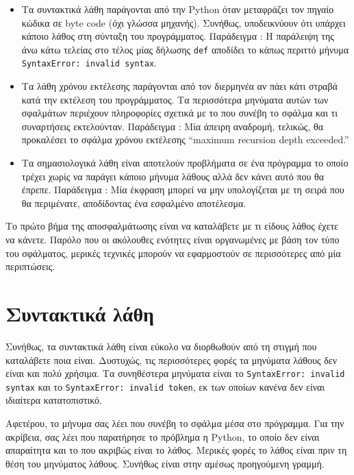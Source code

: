 \documentclass[10pt]{book}
\begin{document}
\begin{itemize}

\item  Τα συντακτικά λάθη παράγονται από την  Python  όταν μεταφράζει τον πηγαίο 
  κώδικα σε  byte code  (όχι γλώσσα μηχανής).  Συνήθως, υποδεικνύουν ότι υπάρχει κάποιο 
  λάθος στη σύνταξη του προγράμματος.  Παράδειγμα :   Η παράλειψη της άνω κάτω τελείας 
  στο τέλος μίας δήλωσης  {\tt def}  αποδίδει το κάπως περιττό μήνυμα  
  {\tt SyntaxError: invalid syntax}.

\item  Τα λάθη χρόνου εκτέλεσης παράγονται από τον διερμηνέα αν πάει κάτι στραβά κατά την 
  εκτέλεση του προγράμματος.  Τα περισσότερα μηνύματα αυτών των σφαλμάτων περιέχουν 
  πληροφορίες σχετικά με το που συνέβη το σφάλμα και τι συναρτήσεις εκτελούνταν. 
  Παράδειγμα :  Μία άπειρη αναδρομή, τελικώς, θα προκαλέσει το σφάλμα χρόνου εκτέλεσης 
   ``maximum recursion depth exceeded.''

\item  Τα σημασιολογικά λάθη είναι αποτελούν προβλήματα σε ένα πρόγραμμα το οποίο τρέχει 
  χωρίς να παράγει κάποιο μήνυμα λάθους αλλά δεν κάνει αυτό που θα έπρεπε.  Παράδειγμα : 
   Μία έκφραση μπορεί να μην υπολογίζεται με τη σειρά που θα περιμένατε, αποδίδοντας 
  ένα εσφαλμένο αποτέλεσμα. 

\end{itemize}

 Το πρώτο βήμα της αποσφαλμάτωσης είναι να καταλάβετε με τι είδους λάθος έχετε να κάνετε.  
Παρόλο που οι ακόλουθες ενότητες είναι οργανωμένες με βάση τον τύπο του σφάλματος, μερικές τεχνικές μπορούν να εφαρμοστούν σε περισσότερες από μία περιπτώσεις.


\section{Συντακτικά λάθη}

Συνήθως, τα συντακτικά λάθη είναι εύκολο να διορθωθούν από τη στιγμή που καταλάβετε ποια 
είναι.  Δυστυχώς, τις περισσότερες φορές τα μηνύματα λάθους δεν είναι και πολύ χρήσιμα. 
Τα συνηθέστερα μηνύματα είναι το  {\tt SyntaxError: invalid syntax}  και το  
{\tt SyntaxError: invalid token},  εκ των οποίων κανένα δεν είναι ιδιαίτερα κατατοπιστικό. 

Αφετέρου, το μήνυμα σας λέει που συνέβη το σφάλμα μέσα στο πρόγραμμα.  Για την ακρίβεια, σας 
λέει που παρατήρησε το πρόβλημα η  Python,  το οποίο δεν είναι απαραίτητα και το που ακριβώς είναι το λάθος.  Μερικές φορές το λάθος είναι πριν τη θέση του μηνύματος λάθους. 
Συνήθως είναι στην αμέσως προηγούμενη γραμμή.
\end{document}
